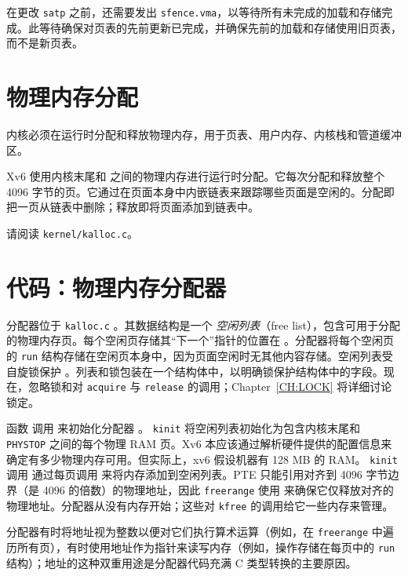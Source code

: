 在更改
\texttt{satp}
之前，还需要发出 \texttt{sfence.vma}，以等待所有未完成的加载和存储完成。此等待确保对页表的先前更新已完成，并确保先前的加载和存储使用旧页表，而不是新页表。

\section{物理内存分配}

内核必须在运行时分配和释放物理内存，用于页表、用户内存、内核栈和管道缓冲区。

Xv6 使用内核末尾和  之间的物理内存进行运行时分配。它每次分配和释放整个 4096 字节的页。它通过在页面本身中内嵌链表来跟踪哪些页面是空闲的。分配即把一页从链表中删除；释放即将页面添加到链表中。

请阅读 {\tt kernel/kalloc.c}。

\section{代码：物理内存分配器}

分配器位于 {\tt kalloc.c} 。其数据结构是一个 \textit{空闲列表}（free list），包含可用于分配的物理内存页。每个空闲页存储其``下一个''指针的位置在  。分配器将每个空闲页的 \lstinline{run} 结构存储在空闲页本身中，因为页面空闲时无其他内容存储。空闲列表受自旋锁保护 。列表和锁包装在一个结构体中，以明确锁保护结构体中的字段。现在，忽略锁和对 \lstinline{acquire} 与 \lstinline{release} 的调用；Chapter~\ref{CH:LOCK} 将详细讨论锁定。

函数
调用
来初始化分配器
。
\lstinline{kinit} 将空闲列表初始化为包含内核末尾和 {\tt PHYSTOP} 之间的每个物理 RAM 页。Xv6 本应该通过解析硬件提供的配置信息来确定有多少物理内存可用。但实际上，xv6 假设机器有 128 MB 的 RAM。
\lstinline{kinit}
调用
通过每页调用
来将内存添加到空闲列表。PTE 只能引用对齐到 4096 字节边界（是 4096 的倍数）的物理地址，因此
\lstinline{freerange}
使用
来确保它仅释放对齐的物理地址。分配器从没有内存开始；这些对
\lstinline{kfree}
的调用给它一些内存来管理。

分配器有时将地址视为整数以便对它们执行算术运算（例如，在 \lstinline{freerange} 中遍历所有页），有时使用地址作为指针来读写内存（例如，操作存储在每页中的 \lstinline{run} 结构）；地址的这种双重用途是分配器代码充满 C 类型转换的主要原因。


